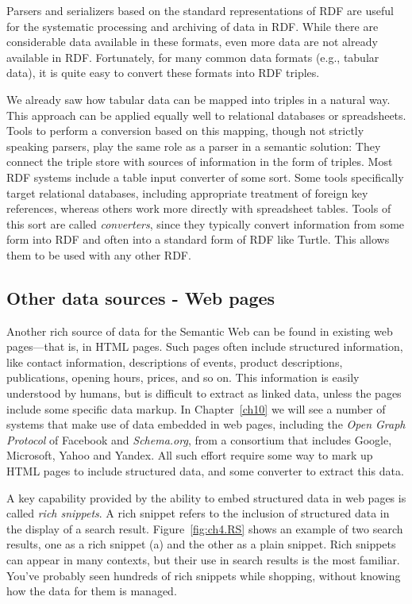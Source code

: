 Parsers and serializers based on the standard representations of RDF are
useful for the systematic processing and archiving of data in RDF. While
there are considerable data available in these formats, even more data
are not already available in RDF. Fortunately, for many common data
formats (e.g., tabular data), it is quite easy to convert these formats
into RDF triples.

We already saw how tabular data can be mapped into triples in a natural
way. This approach can be applied equally well to relational databases or
spreadsheets. Tools to perform a conversion based on this mapping,
though not strictly speaking parsers, play the same role as a parser in
a semantic solution: They connect the triple store with sources of
information in the form of triples. Most RDF systems include a table
input converter of some sort. Some tools specifically target relational
databases, including appropriate treatment of foreign key references,
whereas others work more directly with spreadsheet tables. Tools of this
sort are called \emph{converters}, since they typically convert information
from some form into RDF and often into a standard form of RDF like
Turtle. This allows them to be used with any other RDF. 


\subsection{Other data sources - Web pages}
\label{webembed}

Another rich
source of data for the Semantic Web can be found in existing web
pages---that is, in HTML pages. Such pages often include structured
information, like contact information, descriptions of events, product
descriptions, publications, opening hours, prices, and so on. This information is 
easily understood by humans, but is difficult to extract as linked
data, unless the pages include some specific data markup.   In Chapter~\ref{ch10} 
we will see a number of systems that make use of data embedded in web pages, including 
the \emph{Open Graph Protocol} of Facebook and \emph{Schema.org}, from a consortium that
includes Google, Microsoft, Yahoo and Yandex.   All such effort require some way to
mark up HTML pages to include structured data, and some converter to extract this data. 

A key capability provided by the ability to embed structured data in web pages is 
called \emph{rich snippets}.  A rich snippet refers to the inclusion of structured
data in the display of a search result.  Figure~\ref{fig:ch4.RS} shows an example of two 
search results, one as a rich snippet (a) and the other as a plain snippet.  Rich snippets
can appear in many contexts, but their use in search results is the most familiar. 
You've probably seen hundreds of rich snippets while shopping, without knowing how
the data for them is managed. 

